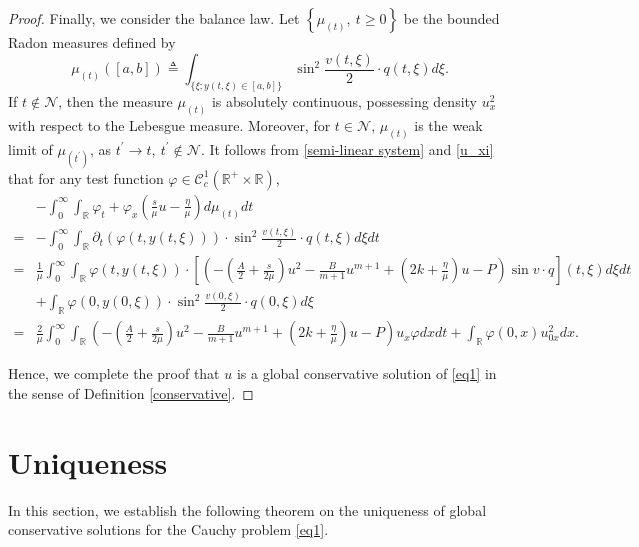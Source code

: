 \documentclass[10pt]{article}
\numberwithin{equation}{section}
\begin{document}
\begin{proof}
		Finally, we consider the balance law. Let $\left\{\mu_{(t)},\ t\geq0\right\}$ be the bounded Radon measures defined by
		\begin{equation}
			\mu_{(t)}\left([a,b]\right)\triangleq\int_{\{\xi;y(t,\xi)\in[a,b]\}}\sin^2\frac{v(t,\xi)}{2}\cdot q(t,\xi)d\xi.
		\end{equation}
		If $t\notin\mathcal{N}$, then the measure $\mu_{(t)}$ is absolutely continuous, possessing density $u_x^2$ with respect to the Lebesgue measure. Moreover, for $t\in\mathcal{N}$, $\mu_{(t)}$ is the weak limit of $\mu_{(t^\prime)}$, as $t^\prime\to t,\ t^\prime\notin\mathcal{N}$. It follows from \eqref{semi-linear system} and \eqref{u_xi} that for any test function $\varphi\in\mathcal{C}_c^1(\mathbb{R}^+\times\mathbb{R})$,
		\begin{align*}
			&-\int_{0}^{\infty}\int_\mathbb{R}\varphi_t+\varphi_x\left(\frac{s}{\mu}u-\frac{\eta}{\mu}\right)d\mu_{(t)}dt\\
			=&-\int_{0}^{\infty}\int_\mathbb{R}\partial_t(\varphi(t,y(t,\xi)))\cdot\sin^2\frac{v(t,\xi)}{2}\cdot q(t,\xi)d\xi dt\\
			=&\frac{1}{\mu}\int_{0}^{\infty}\int_\mathbb{R}\varphi(t,y(t,\xi))\cdot\left[\left(-\left(\frac{A}{2}+\frac{s}{2\mu}\right)u^2-\frac{B}{m+1}u^{m+1}+\left(2k+\frac{\eta}{\mu}\right)u-P\right)\sin v\cdot q\right](t,\xi) d\xi dt\\
			&+\int_{\mathbb{R}}\varphi(0,y(0,\xi))\cdot\sin^2\frac{v(0,\xi)}{2}\cdot q(0,\xi)d\xi\\
			=&\frac{2}{\mu}\int_{0}^{\infty}\int_\mathbb{R}\left(-\left(\frac{A}{2}+\frac{s}{2\mu}\right)u^2-\frac{B}{m+1}u^{m+1}+\left(2k+\frac{\eta}{\mu}\right)u-P\right)u_x\varphi  dxdt+\int_{\mathbb{R}}\varphi(0,x)u_{0x}^{2}dx.
		\end{align*}	
		
		Hence, we complete the proof that $u$ is a global conservative solution of \eqref{eq1} in the sense of Definition \ref{conservative}.
	\end{proof}
	\section{Uniqueness}\label{Uniqueness}
	In this section, we establish the following theorem on the uniqueness of global conservative solutions for the Cauchy problem \eqref{eq1}.
	
\end{document}
